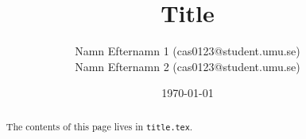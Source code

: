 \title{Title}
\author{Namn Efternamn 1 (cas0123@student.umu.se) \\
        Namn Efternamn 2 (cas0123@student.umu.se)}
\date{\today}

\begin{titlepage}
  \maketitle
  \thispagestyle{fancy}
  \rhead{\today}
  \begin{abstract}
    The contents of this page lives in \texttt{title.tex}.
  \end{abstract}
\end{titlepage}
